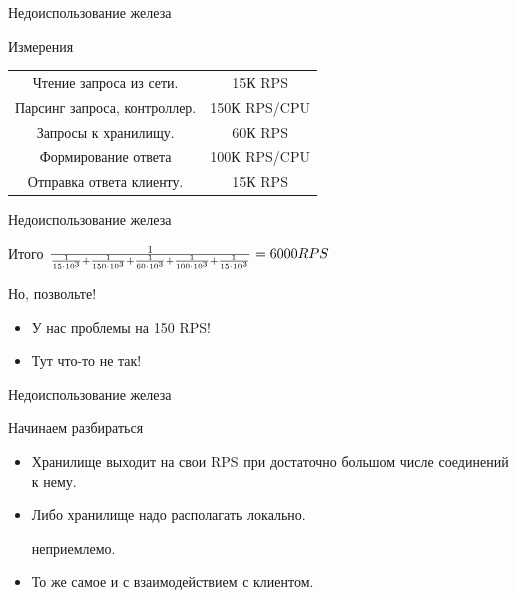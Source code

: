 \documentclass[aspectratio=169]{beamer}
\begin{document}
\begin{frame}{Недоиспользование железа}
    \begin{block}{Измерения}
        \begin{tabular}{ c c }
            Чтение запроса из сети. & 15К RPS  \\
            Парсинг запроса, контроллер. & 150К RPS/CPU  \\
            Запросы к хранилищу. & 60К RPS \\
            Формирование ответа & 100К RPS/CPU \\
            Отправка ответа клиенту. & 15К RPS \\
        \end{tabular}
    \end{block}
\end{frame}


\begin{frame}{Недоиспользование железа}
    \begin{block}{Итого}
        {\huge
            $\frac{1}{                                      %
                \frac{1}{15 \cdot 10^3} +                   %
                \frac{1}{150 \cdot 10^3} +                  %
                \frac{1}{60 \cdot 10^3} +                   %
                \frac{1}{100 \cdot 10^3} +                  %
                \frac{1}{15 \cdot 10^3}} = 6000 RPS$
        }
    \end{block}

    \pause
    \begin{block}{Но, позвольте!}
        \begin{itemize}
            \item У нас проблемы на 150 RPS!
            \item Тут что-то не так!
        \end{itemize}
    \end{block}
\end{frame}


\begin{frame}{Недоиспользование железа}
    \begin{block}{Начинаем разбираться}
        \begin{itemize}
            \item Хранилище выходит на свои RPS при достаточно большом
                числе соединений к нему.
            \item Либо хранилище надо располагать локально.
                \par {\small неприемлемо.}
            \item То же самое и с взаимодействием с клиентом.
        \end{itemize}
    \end{block}
\end{frame}
\end{document}
